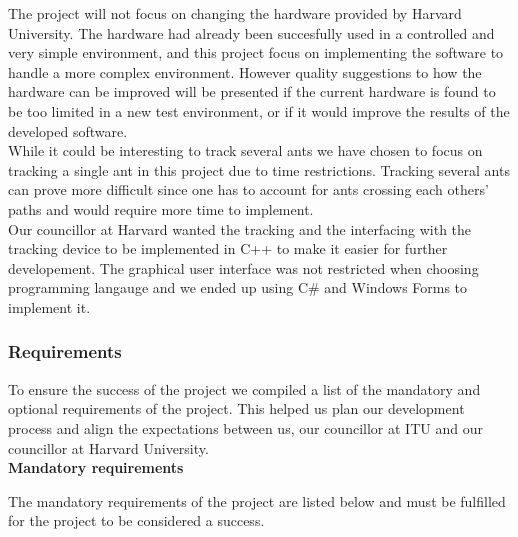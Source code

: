 The project will not focus on changing the hardware provided by Harvard University. The hardware had already been succesfully used in a controlled and very simple environment, and this project focus on implementing the software to handle a more complex environment. However quality suggestions to how the hardware can be improved will be presented if the current hardware is found to be too limited in a new test environment, or if it would improve the results of the developed software.\\

While it could be interesting to track several ants we have chosen to focus on tracking a single ant in this project due to time restrictions. Tracking several ants can prove more difficult since one has to account for ants crossing each others' paths and would require more time to implement.\\

Our councillor at Harvard wanted the tracking and the interfacing with the tracking device to be implemented in C++ to make it easier for further developement. The graphical user interface was not restricted when choosing programming langauge and we ended up using C\# and Windows Forms to implement it.

\subsubsection{Requirements} \mbox{}\par
\label{requirements}

To ensure the success of the project we compiled a list of the mandatory and optional requirements of the project. This helped us plan our development process and align the expectations between us, our councillor at ITU and our councillor at Harvard University. \\

\noindent \textbf{Mandatory requirements} \par
The mandatory requirements of the project are listed below and must be fulfilled for the project to be considered a success.


